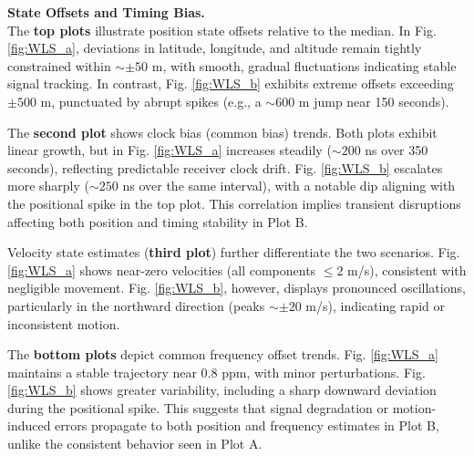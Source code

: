         \vspace{0.5em}
        \noindent\textbf{State Offsets and Timing Bias.} 
        \\The \textbf{top plots} illustrate position state offsets relative to the median. In Fig. \ref{fig:WLS_a}, deviations in latitude, longitude, and altitude remain tightly constrained within $\sim \pm 50$ m, with smooth, gradual fluctuations indicating stable signal tracking. In contrast, Fig. \ref{fig:WLS_b} exhibits extreme offsets exceeding $\pm 500$ m, punctuated by abrupt spikes (e.g., a $\sim 600$ m jump near 150 seconds).  

        The \textbf{second plot} shows clock bias (common bias) trends. Both plots exhibit linear growth, but in Fig. \ref{fig:WLS_a} increases steadily ($\sim 200$ ns over 350 seconds), reflecting predictable receiver clock drift. Fig. \ref{fig:WLS_b} escalates more sharply ($\sim 250$ ns over the same interval), with a notable dip aligning with the positional spike in the top plot. This correlation implies transient disruptions affecting both position and timing stability in Plot B.  

        Velocity state estimates (\textbf{third plot}) further differentiate the two scenarios. Fig. \ref{fig:WLS_a} shows near-zero velocities (all components $\leq 2$ m/s), consistent with negligible movement. Fig. \ref{fig:WLS_b}, however, displays pronounced oscillations, particularly in the northward direction (peaks $\sim \pm 20$ m/s), indicating rapid or inconsistent motion.  

        The \textbf{bottom plots} depict common frequency offset trends. Fig. \ref{fig:WLS_a} maintains a stable trajectory near $0.8$ ppm, with minor perturbations. Fig. \ref{fig:WLS_b} shows greater variability, including a sharp downward deviation during the positional spike. This suggests that signal degradation or motion-induced errors propagate to both position and frequency estimates in Plot B, unlike the consistent behavior seen in Plot A.  

